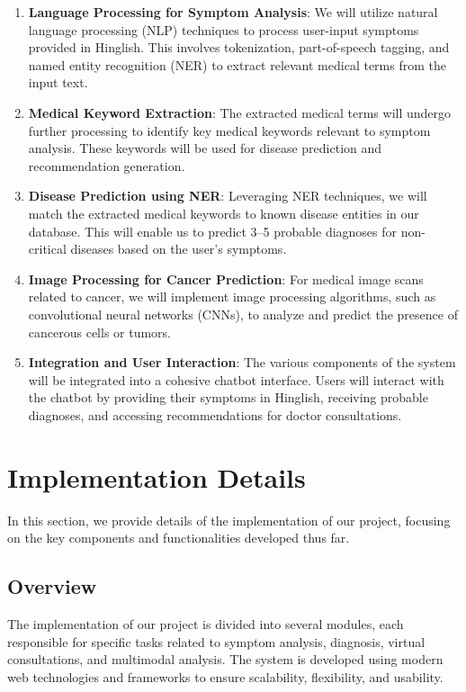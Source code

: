 \documentclass[onecolumn]{article}
\begin{document}
\begin{enumerate}
\item \textbf{Language Processing for Symptom Analysis}: We will utilize natural language processing (NLP) techniques to process user-input symptoms provided in Hinglish. This involves tokenization, part-of-speech tagging, and named entity recognition (NER) to extract relevant medical terms from the input text.
\item \textbf{Medical Keyword Extraction}: The extracted medical terms will undergo further processing to identify key medical keywords relevant to symptom analysis. These keywords will be used for disease prediction and recommendation generation.
\item \textbf{Disease Prediction using NER}: Leveraging NER techniques, we will match the extracted medical keywords to known disease entities in our database. This will enable us to predict 3–5 probable diagnoses for non-critical diseases based on the user's symptoms.
\item \textbf{Image Processing for Cancer Prediction}: For medical image scans related to cancer, we will implement image processing algorithms, such as convolutional neural networks (CNNs), to analyze and predict the presence of cancerous cells or tumors.
\item \textbf{Integration and User Interaction}: The various components of the system will be integrated into a cohesive chatbot interface. Users will interact with the chatbot by providing their symptoms in Hinglish, receiving probable diagnoses, and accessing recommendations for doctor consultations.
\end{enumerate}

\section{Implementation Details}
In this section, we provide details of the implementation of our project, focusing on the key components and functionalities developed thus far.

\subsection{Overview}

The implementation of our project is divided into several modules, each responsible for specific tasks related to symptom analysis, diagnosis, virtual consultations, and multimodal analysis. The system is developed using modern web technologies and frameworks to ensure scalability, flexibility, and usability.
\end{document}
